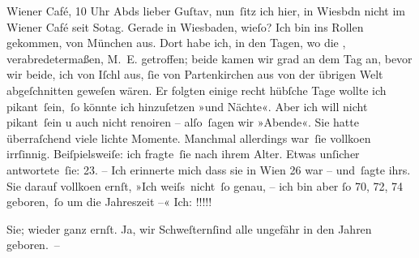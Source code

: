 \pstart
           \raggedleft{}Wiener Café, 10 Uhr Abds\pend
           \vspace{0.5em}
\pstart
           lieber Guſtav, nun ſitz ich hier, in Wiesbdn nicht im Wiener Café seit So{\geminationn}tag. Gerade in Wiesbaden, wieſo? Ich
               bin ins Rollen gekommen, von München aus. Dort
               habe ich, in den Tagen, wo die \label{K_L04093-1v}\label{K_L04093-1}, verabredetermaßen, M. E. getroffen; beide kamen wir grad an dem Tag an, bevor wir
               beide, ich von Iſchl aus,{ }ſie von Partenkirchen aus von der übrigen Welt
               abgeſchnitten geweſen wären. Er folgten einige recht hübſche Tage wollte ich
               pikant ſein, ſo könnte ich hinzuſetzen »und Nächte«. Aber ich will nicht pikant ſein
               u auch nicht reno{\geminationm}iren – alſo ſagen wir »Abende«. Sie
               hatte überraſchend viele lichte Momente. Manchmal allerdings war ſie vollko{\geminationm}en irrſinnig. Beiſpielsweiſe: ich fragte ſie nach
               ihrem Alter. Etwas unſicher antwortete ſie: 23. – Ich erinnerte mich {\pb}dass sie in Wien 26 war – und ſagte ihrs. Sie darauf vollko{\geminationm}en ernſt, »Ich weiſs nicht ſo genau, – ich bin aber{ }ſo
                  70, 72, 74 geboren, ſo um die Jahreszeit –«
               Ich: !!!!!\pend
           
\pstart
           Sie; wieder ganz ernſt. Ja, wir Schweſternſind alle
               ungefähr in den Jahren geboren. –\pend
           
